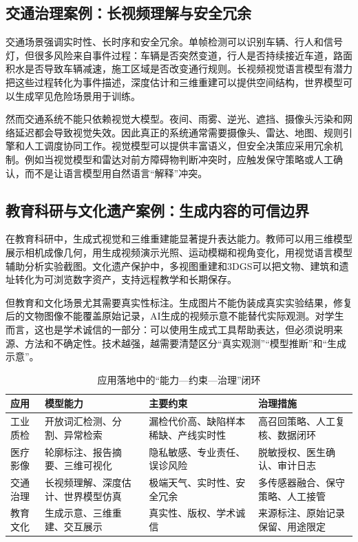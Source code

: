 \documentclass[UTF8,a4paper,12pt]{ctexart}
\begin{document}
\subsection{交通治理案例：长视频理解与安全冗余}
交通场景强调实时性、长时序和安全冗余。单帧检测可以识别车辆、行人和信号灯，但很多风险来自事件过程：车辆是否突然变道，行人是否持续接近车道，路面积水是否导致车辆减速，施工区域是否改变通行规则。长视频视觉语言模型有潜力把这些过程转化为事件描述，深度估计和三维重建可以提供空间结构，世界模型可以生成罕见危险场景用于训练。

然而交通系统不能只依赖视觉大模型。夜间、雨雾、逆光、遮挡、摄像头污染和网络延迟都会导致视觉失效。因此真正的系统通常需要摄像头、雷达、地图、规则引擎和人工调度协同工作。视觉模型可以提供丰富语义，但安全决策应采用冗余机制。例如当视觉模型和雷达对前方障碍物判断冲突时，应触发保守策略或人工确认，而不是让语言模型用自然语言“解释”冲突。

\subsection{教育科研与文化遗产案例：生成内容的可信边界}
在教育科研中，生成式视觉和三维重建能显著提升表达能力。教师可以用三维模型展示相机成像几何，用生成视频演示光照、运动模糊和视角变化，用视觉语言模型辅助分析实验截图。文化遗产保护中，多视图重建和3DGS可以把文物、建筑和遗址转化为可浏览数字资产，支持远程教学和长期保存。

但教育和文化场景尤其需要真实性标注。生成图片不能伪装成真实实验结果，修复后的文物图像不能覆盖原始记录，AI生成的视频示意不能替代实际观测。对学生而言，这也是学术诚信的一部分：可以使用生成式工具帮助表达，但必须说明来源、方法和不确定性。技术越强，越需要清楚区分“真实观测”“模型推断”和“生成示意”。

\begin{table}[htbp]
\centering
\small
\caption{应用落地中的“能力—约束—治理”闭环}
\begin{tabularx}{\textwidth}{C{2.4cm}Y Y Y}
\toprule
\textbf{应用} & \textbf{模型能力} & \textbf{主要约束} & \textbf{治理措施} \\
\midrule
工业质检 & 开放词汇检测、分割、异常检索 & 漏检代价高、缺陷样本稀缺、产线实时性 & 高召回策略、人工复核、数据闭环 \\
医疗影像 & 轮廓标注、报告摘要、三维可视化 & 隐私敏感、专业责任、误诊风险 & 脱敏授权、医生确认、审计日志 \\
交通治理 & 长视频理解、深度估计、世界模型仿真 & 极端天气、实时性、安全冗余 & 多传感器融合、保守策略、人工接管 \\
教育文化 & 生成示意、三维重建、交互展示 & 真实性、版权、学术诚信 & 来源标注、原始记录保留、用途限定 \\
\bottomrule
\end{tabularx}
\end{table}
\end{document}
